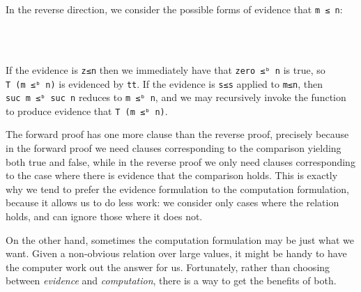In the reverse direction, we consider the possible forms of evidence
that \texttt{m\ ≤\ n}:

\begin{fence}
\begin{code}%
\>[0]\AgdaSpace{}%
\AgdaSymbol{:}\AgdaSpace{}%
\AgdaSpace{}%
\AgdaSymbol{\{}\AgdaSpace{}%
\AgdaSpace{}%
\AgdaSymbol{:}\AgdaSpace{}%
\AgdaSymbol{\}}\AgdaSpace{}%
\AgdaSpace{}%
\AgdaSpace{}%
\AgdaSpace{}%
\AgdaSpace{}%
\AgdaSpace{}%
\AgdaSpace{}%
\AgdaSymbol{(}\AgdaSpace{}%
\AgdaSpace{}%
\AgdaSymbol{)}\<%
\\
\>[0]\AgdaSpace{}%
%
\>[16]\AgdaSymbol{=}%
\>[19]\<%
\\
\>[0]\AgdaSpace{}%
\AgdaSymbol{(}\AgdaSpace{}%
\AgdaSymbol{)}%
\>[16]\AgdaSymbol{=}%
\>[19]\AgdaSpace{}%
\<%
\end{code}
\end{fence}

If the evidence is \texttt{z≤n} then we immediately have that
\texttt{zero\ ≤ᵇ\ n} is true, so \texttt{T\ (m\ ≤ᵇ\ n)} is evidenced by
\texttt{tt}. If the evidence is \texttt{s≤s} applied to \texttt{m≤n},
then \texttt{suc\ m\ ≤ᵇ\ suc\ n} reduces to \texttt{m\ ≤ᵇ\ n}, and we
may recursively invoke the function to produce evidence that
\texttt{T\ (m\ ≤ᵇ\ n)}.

The forward proof has one more clause than the reverse proof, precisely
because in the forward proof we need clauses corresponding to the
comparison yielding both true and false, while in the reverse proof we
only need clauses corresponding to the case where there is evidence that
the comparison holds. This is exactly why we tend to prefer the evidence
formulation to the computation formulation, because it allows us to do
less work: we consider only cases where the relation holds, and can
ignore those where it does not.

On the other hand, sometimes the computation formulation may be just
what we want. Given a non-obvious relation over large values, it might
be handy to have the computer work out the answer for us. Fortunately,
rather than choosing between \emph{evidence} and \emph{computation},
there is a way to get the benefits of both.

